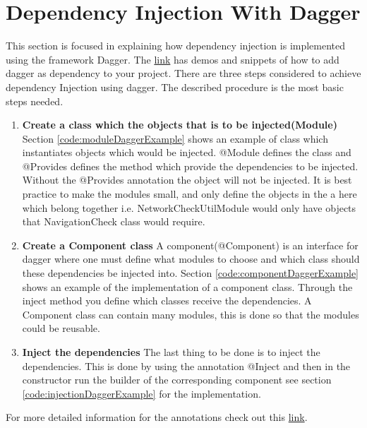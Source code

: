 \newpage
\section{Dependency Injection With Dagger}
    This section is focused in explaining how dependency injection is implemented
    using the framework Dagger.
    The \href{https://github.com/slidenerd/Vivz_Dagger_2_Demo}{link} has demos and snippets
    of how to add dagger as dependency to your project. There are three steps considered
    to achieve dependency Injection using dagger. The described procedure is the most
    basic steps needed. 
    \begin{enumerate}
        \item 
            \textbf{Create a class which the objects that is to be injected(Module)}
                Section \ref{code:moduleDaggerExample} shows an example of class which instantiates 
                objects which would be injected. @Module defines the class and @Provides
                defines the method which provide the dependencies to be injected. Without the
                @Provides annotation the object will not be injected. 
                It is best practice to make the modules small, and only define 
                the objects in the a here 
                which belong together i.e. NetworkCheckUtilModule would only have
                objects that NavigationCheck class would require.  
        \item 
            \textbf{Create a Component class}
                A component(@Component) is an interface for dagger where one  must define 
                what modules to choose and which class should these dependencies be injected into. 
                Section \ref{code:componentDaggerExample} shows an example of the implementation of a 
                component class.
                Through the inject method you define
                which classes receive the dependencies. A Component class can contain 
                many modules, this is done so that the modules could be reusable. 
        \item 
            \textbf{Inject the dependencies}
                The last thing to be done is to inject the dependencies. This is done by
                using the annotation @Inject and then in the constructor run the builder
                of the corresponding component see section \ref{code:injectionDaggerExample} for the
                implementation. 
    \end{enumerate}
    For more detailed information for the annotations check out
    this \href{http://www.vogella.com/tutorials/Dagger/article.html}
    {link}.